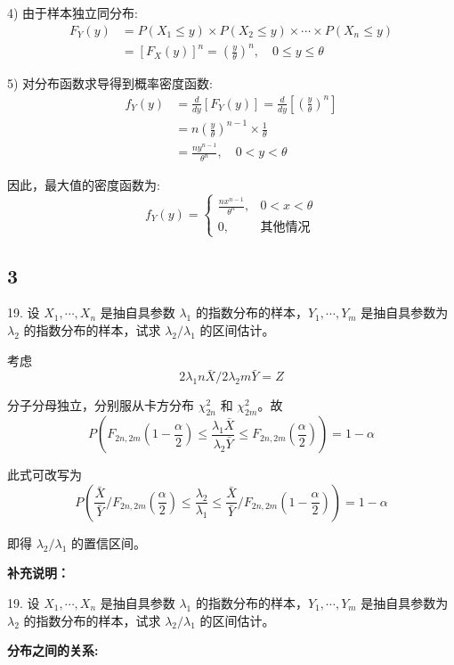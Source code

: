 \documentclass[UTF8]{report}
\theoremstyle{MyLineTheoremStyle} %
\theoremstyle{MyBlockTheoremStyle} %
\theoremstyle{MySubsubsectionStyle} %
\begin{document}
4) 由于样本独立同分布:
   $$\begin{aligned}
   F_Y(y) &= P(X_1 \leqslant y) \times P(X_2 \leqslant y) \times \cdots \times P(X_n \leqslant y) \\
   &= [F_X(y)]^n = (\frac{y}{\theta})^n, \quad 0 \leqslant y \leqslant \theta
   \end{aligned}$$

5) 对分布函数求导得到概率密度函数:
   $$\begin{aligned}
   f_Y(y) &= \frac{d}{dy}[F_Y(y)] = \frac{d}{dy}[(\frac{y}{\theta})^n] \\
   &= n(\frac{y}{\theta})^{n-1} \times \frac{1}{\theta} \\
   &= \frac{ny^{n-1}}{\theta^n}, \quad 0 < y < \theta
   \end{aligned}$$

因此，最大值的密度函数为:
$$f_Y(y) = \begin{cases}
\frac{nx^{n-1}}{\theta^n}, & 0 < x < \theta \\
0, & \text{其他情况}
\end{cases}$$

\subsection{3}

19. 设 $X_1,\cdots,X_n$ 是抽自具参数 $\lambda_1$ 的指数分布的样本，$Y_1,\cdots,Y_m$ 是抽自具参数为 $\lambda_2$ 的指数分布的样本，试求 $\lambda_2/\lambda_1$ 的区间估计。

考虑
$$
2\lambda_1 n\bar{X} / 2\lambda_2 m\bar{Y} = Z
$$

分子分母独立，分别服从卡方分布 $\chi^2_{2n}$ 和 $\chi^2_{2m}$。故
$$
P\left(F_{2n,2m}\left(1-\frac{\alpha}{2}\right)\leqslant\frac{\lambda_1\bar{X}}{\lambda_2\bar{Y}}\leqslant F_{2n,2m}\left(\frac{\alpha}{2}\right)\right)=1-\alpha
$$

此式可改写为
$$
P\left(\frac{\bar{X}}{\bar{Y}}/F_{2n,2m}\left(\frac{\alpha}{2}\right)\leqslant\frac{\lambda_2}{\lambda_1}\leqslant\frac{\bar{X}}{\bar{Y}}/F_{2n,2m}\left(1-\frac{\alpha}{2}\right)\right)=1-\alpha
$$

即得 $\lambda_2/\lambda_1$ 的置信区间。

\textbf{补充说明：}

19. 设 $X_1,\cdots,X_n$ 是抽自具参数 $\lambda_1$ 的指数分布的样本，$Y_1,\cdots,Y_m$ 是抽自具参数为 $\lambda_2$ 的指数分布的样本，试求 $\lambda_2/\lambda_1$ 的区间估计。

\textbf{分布之间的关系:}
\end{document}
